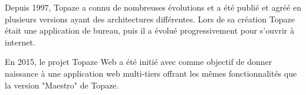 Depuis 1997, Topaze a connu de nombreuses évolutions et a été publié et agréé en plusieurs versions ayant des architectures différentes. Lors de sa création Topaze était une application de bureau, puis il a évolué progressivement pour s'ouvrir à internet.
 
En 2015, le projet Topaze Web a été initié avec comme objectif de donner naissance à une application web multi-tiers offrant les mêmes fonctionnalités que la version "Maestro" de Topaze.


